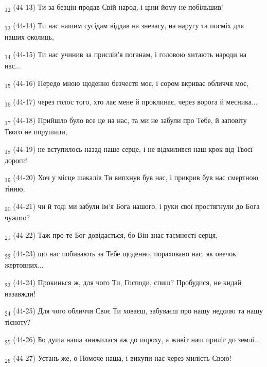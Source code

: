 \begin{tcolorbox}
\textsubscript{12} (44-13) Ти за безцін продав Свій народ, і ціни йому не побільшив!
\end{tcolorbox}
\begin{tcolorbox}
\textsubscript{13} (44-14) Ти нас нашим сусідам віддав на зневагу, на наругу та посміх для наших околиць,
\end{tcolorbox}
\begin{tcolorbox}
\textsubscript{14} (44-15) Ти нас учинив за прислів'я поганам, і головою хитають народи на нас...
\end{tcolorbox}
\begin{tcolorbox}
\textsubscript{15} (44-16) Передо мною щоденно безчестя моє, і сором вкриває обличчя моє,
\end{tcolorbox}
\begin{tcolorbox}
\textsubscript{16} (44-17) через голос того, хто лає мене й проклинає, через ворога й месника...
\end{tcolorbox}
\begin{tcolorbox}
\textsubscript{17} (44-18) Прийшло було все це на нас, та ми не забули про Тебе, й заповіту Твого не порушили,
\end{tcolorbox}
\begin{tcolorbox}
\textsubscript{18} (44-19) не вступилось назад наше серце, і не відхилився наш крок від Твоєї дороги!
\end{tcolorbox}
\begin{tcolorbox}
\textsubscript{19} (44-20) Хоч у місце шакалів Ти випхнув був нас, і прикрив був нас смертною тінню,
\end{tcolorbox}
\begin{tcolorbox}
\textsubscript{20} (44-21) чи й тоді ми забули ім'я Бога нашого, і руки свої простягнули до Бога чужого?
\end{tcolorbox}
\begin{tcolorbox}
\textsubscript{21} (44-22) Таж про те Бог довідається, бо Він знає таємності серця,
\end{tcolorbox}
\begin{tcolorbox}
\textsubscript{22} (44-23) що нас побивають за Тебе щоденно, пораховано нас, як овечок жертовних...
\end{tcolorbox}
\begin{tcolorbox}
\textsubscript{23} (44-24) Прокинься ж, для чого Ти, Господи, спиш? Пробудися, не кидай назавжди!
\end{tcolorbox}
\begin{tcolorbox}
\textsubscript{24} (44-25) Для чого обличчя Своє Ти ховаєш, забуваєш про нашу недолю та нашу тісноту?
\end{tcolorbox}
\begin{tcolorbox}
\textsubscript{25} (44-26) Бо душа наша знижилася аж до пороху, а живіт наш приліг до землі...
\end{tcolorbox}
\begin{tcolorbox}
\textsubscript{26} (44-27) Устань же, о Помоче наша, і викупи нас через милість Свою!
\end{tcolorbox}
